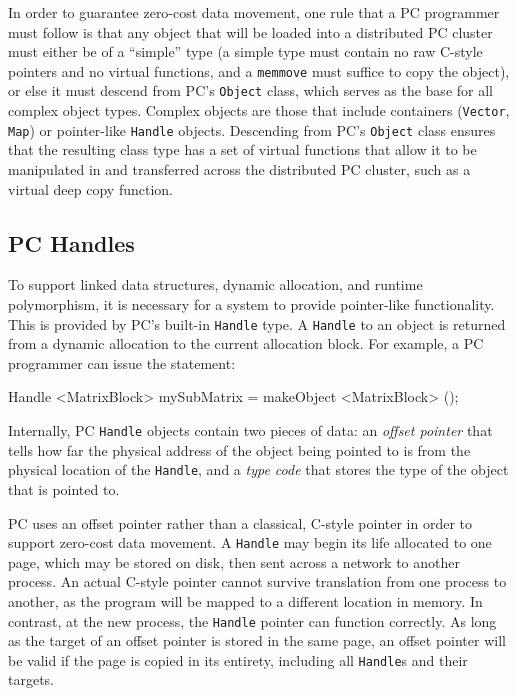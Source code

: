 In order to guarantee zero-cost data movement,
one rule that a PC programmer must follow is that any object that will
be loaded into a distributed PC cluster must either be of a ``simple'' type (a simple type
must contain no raw C-style pointers and no 
virtual functions, and a \texttt{memmove}
must suffice to copy the object), or else it must descend from PC's \texttt{Object} class, which serves as the base for all complex object types.
Complex objects are those that include containers (\texttt{Vector}, \texttt{Map}) or pointer-like \texttt{Handle} objects.  Descending from PC's \texttt{Object} class
ensures that the resulting class type has a set of virtual functions
that allow it to be manipulated in and transferred across the
distributed PC cluster, 
such as a virtual deep copy function.  

\subsection{PC Handles}

To support linked data structures, dynamic allocation, and runtime polymorphism, it is necessary for a 
system to provide pointer-like functionality.  This is provided by PC's built-in \texttt{Handle} type.  
A \texttt{Handle} to an object is returned from a dynamic allocation to the current allocation block.
For example, a PC programmer 
can issue the statement:

\begin{code}
Handle <MatrixBlock> mySubMatrix = makeObject <MatrixBlock> ();
\end{code}

Internally, PC \texttt{Handle} objects contain two pieces of data: an \emph{offset pointer} that tells how far
the physical address of the object being pointed to is from the physical location of the 
\texttt{Handle}, and a \emph{type code} that stores the type of the
object that is pointed to.  

PC uses an offset pointer rather than a classical, C-style pointer in order to support
zero-cost data movement.  
A \texttt{Handle} may begin its life allocated
to one page, which may be stored on disk, then sent across a network
to another process.  
An actual C-style pointer
cannot survive translation from one process to another, as the program will be mapped to a different location in memory.
In contrast, at the new process, the \texttt{Handle} pointer
can function correctly. As long as the target of an offset pointer is stored in the same page, an offset pointer will be valid if the
page is copied in its entirety, including all \texttt{Handle}s and their targets.

